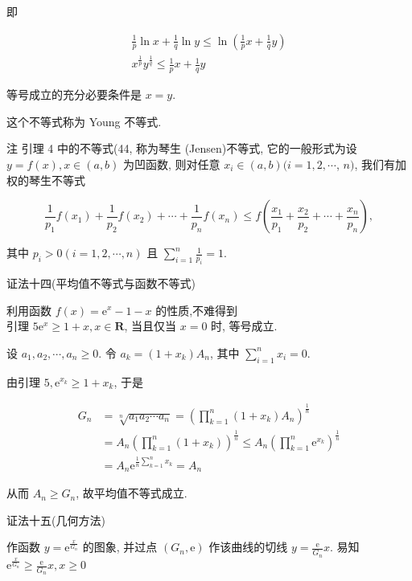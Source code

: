 即

$$
\begin{gathered}
\frac{1}{p} \ln x+\frac{1}{q} \ln y \leqslant \ln \left(\frac{1}{p} x+\frac{1}{q} y\right) \\
x^{\frac{1}{p}} y^{\frac{1}{q}} \leqslant \frac{1}{p} x+\frac{1}{q} y
\end{gathered}
$$

等号成立的充分必要条件是 $x=y$.

这个不等式称为 Young 不等式.

注 引理 4 中的不等式(44, 称为琴生 (Jensen)不等式, 它的一般形式为设 $y=f(x), x \in(a, b)$ 为凹函数, 则对任意 $x_{i} \in(a, b)(i=1,2, \cdots$, $n)$, 我们有加权的琴生不等式

$$
\frac{1}{p_{1}} f\left(x_{1}\right)+\frac{1}{p_{2}} f\left(x_{2}\right)+\cdots+\frac{1}{p_{n}} f\left(x_{n}\right) \leqslant f\left(\frac{x_{1}}{p_{1}}+\frac{x_{2}}{p_{2}}+\cdots+\frac{x_{n}}{p_{n}}\right),
$$

其中 $p_{i}>0(i=1,2, \cdots, n)$ 且 $\sum_{i=1}^{n} \frac{1}{p_{i}}=1$.

证法十四(平均值不等式与函数不等式)

利用函数 $f(x)=\mathrm{e}^{x}-1-x$ 的性质,不难得到\\
引理 $5 \mathrm{e}^{x} \geqslant 1+x, x \in \mathbf{R}$, 当且仅当 $x=0$ 时, 等号成立.

设 $a_{1}, a_{2}, \cdots, a_{n} \geqslant 0$. 令 $a_{k}=\left(1+x_{k}\right) A_{n}$, 其中 $\sum_{i=1}^{n} x_{i}=0$.

由引理 $5, \mathrm{e}^{x_{k}} \geqslant 1+x_{k}$, 于是

$$
\begin{aligned}
G_{n} & =\sqrt[n]{a_{1} a_{2} \cdots a_{n}}=\left(\prod_{k=1}^{n}\left(1+x_{k}\right) A_{n}\right)^{\frac{1}{n}} \\
& =A_{n}\left(\prod_{k=1}^{n}\left(1+x_{k}\right)\right)^{\frac{1}{n}} \leqslant A_{n}\left(\prod_{k=1}^{n} \mathrm{e}^{x_{k}}\right)^{\frac{1}{n}} \\
& =A_{n} \mathrm{e}^{\frac{1}{n} \sum_{k=1}^{n} x_{k}}=A_{n}
\end{aligned}
$$

从而 $A_{n} \geqslant G_{n}$, 故平均值不等式成立.

证法十五(几何方法)

作函数 $y=\mathrm{e}^{\frac{x}{G_{n}}}$ 的图象, 并过点 $\left(G_{n}, \mathrm{e}\right)$ 作该曲线的切线 $y=\frac{\mathrm{e}}{G_{n}} x$. 易知 $\mathrm{e}^{\frac{x}{G_{n}}} \geqslant \frac{\mathrm{e}}{G_{n}} x, x \geqslant 0$


